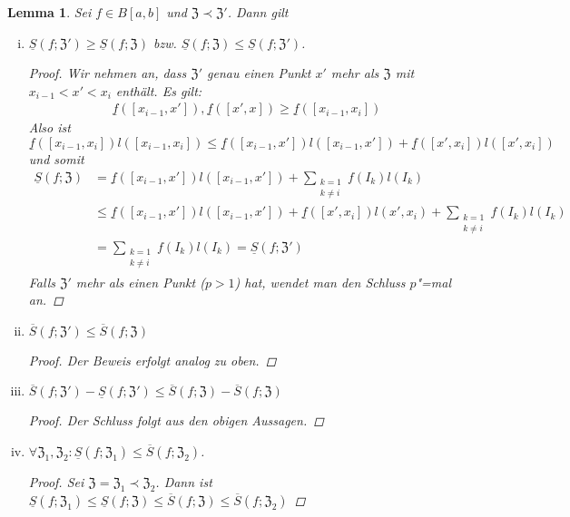 \documentclass[ngerman,titlepage,twoside, parskip=half*]{scrreprt}
\newcommand*{\ZZ}{\mathfrak{Z}}
\theoremstyle{break}
\newtheorem{lemma}{Lemma}
\theoremstyle{nonumberbreak}
\newtheorem{proof}{Beweis:}
\begin{document}
\begin{lemma}\label{lemma:int}
  Sei $f\in B[a,b]$ und $\ZZ\prec \ZZ'$. Dann gilt
  \begin{enumerate}[(i)]
  \item $\underline{S}(f;\ZZ')\geq \underline{S}(f;\ZZ)$
    bzw. $\underline{S}(f;\ZZ) \leq \underline{S}(f; \ZZ')$.
    \begin{proof}
      Wir nehmen an, dass $\ZZ'$ genau einen Punkt $x'$ mehr als
      $\ZZ$ mit $x_{i-1}<x'<x_i$ enthält. Es gilt:
      \begin{gather*}
        \underline{f}([x_{i-1},x']),\underline{f}([x',x])\geq \underline{f}
        ([x_{i-1},x_i])
      \end{gather*}
      Also ist $\underline{f}([x_{i-1},x_i])l([x_{i-1},x_i])\leq 
      \underline{f}([x_{i-1},x'])l([x_{i-1},x'])+\underline{f}([x',x_i])
      l([x',x_i])$ und somit
      \begin{align*}
        \underline{S}(f;\ZZ) &= \underline{f} ([x_{i-1}, x']) l
        ([x_{i-1}, x'])+ \sum_{\substack{k=1\\ k\neq i}} f (I_{k})l
        (I_{k})\\
        &\leq \underline{f} ([x_{i-1}, x']) l([x_{i-1}, x'])+
        \underline{f} ([x', x_{i}]) l (x', x_{i})+
        \sum_{\substack{k=1\\ k\neq i}} f (I_{k})l(I_{k})\\
        &= \sum_{\substack{k=1\\ k\neq i}} f(I_{k}) l(I_{k})= \underline{S}(f;\ZZ')
      \end{align*}
      Falls $\ZZ'$ mehr als einen Punkt ($p>1$) hat, wendet man den Schluss
      $p$"=mal an.
    \end{proof}
  \item $\overline{S}(f;\ZZ')\leq \overline{S}(f;\ZZ)$
    \begin{proof}
      Der Beweis erfolgt analog zu oben.
    \end{proof}
  \item $\overline{S}(f;\ZZ')-\underline{S}(f;\ZZ')\leq \overline{S}(f;\ZZ)
    -\overline{S}(f;\ZZ)$
    \begin{proof}
      Der Schluss folgt aus den obigen Aussagen.
    \end{proof}
  \item $\forall \ZZ_1,\ZZ_2\colon \underline{S}(f;\ZZ_1)\leq \overline{S}
    (f;\ZZ_2)$.
    \begin{proof}
      Sei $\ZZ=\ZZ_1\prec \ZZ_2$. Dann ist $\underline{S}
      (f;\ZZ_1)\leq \underline{S}(f;\ZZ)\leq \overline{S}(f;\ZZ)\leq
      \overline{S}(f;\ZZ_2)$
    \end{proof}
  \end{enumerate}
\end{lemma}
\end{document}
